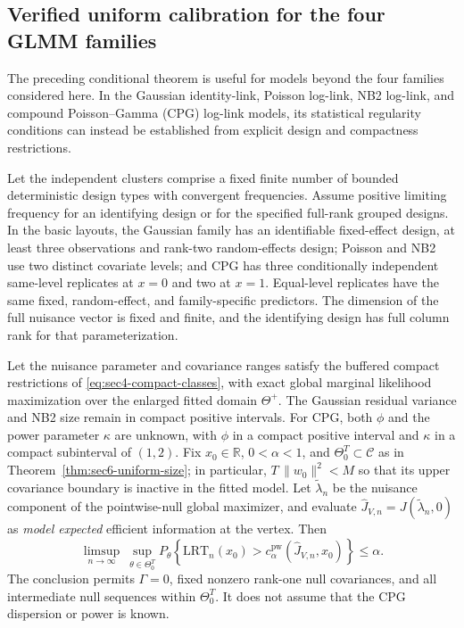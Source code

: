 \subsection{Verified uniform calibration for the four GLMM families}
\label{subsec:sec6-four-family-uniform}

The preceding conditional theorem is useful for models
beyond the four families considered here. In the Gaussian
identity-link, Poisson log-link, NB2 log-link, and compound
Poisson--Gamma (CPG) log-link models, its statistical
regularity conditions can instead be established from
explicit design and compactness restrictions.

\begin{theorem}
\label{thm:sec6-four-family-uniform}
Let the independent clusters comprise a fixed finite number
of bounded deterministic design types with convergent
frequencies. Assume positive limiting frequency for an
identifying design or for the specified full-rank grouped
designs. In the basic layouts, the Gaussian family has an
identifiable fixed-effect design, at least three observations
and rank-two random-effects design; Poisson and NB2 use two
distinct covariate levels; and CPG has three conditionally
independent same-level replicates at $x=0$ and two at $x=1$.
Equal-level replicates have the same fixed, random-effect,
and family-specific predictors. The dimension of the full
nuisance vector is fixed and finite, and the identifying
design has full column rank for that parameterization.

Let the nuisance parameter and covariance ranges satisfy
the buffered compact restrictions of
\eqref{eq:sec4-compact-classes}, with exact global marginal
likelihood maximization over the enlarged fitted domain
$\Theta^+$. The Gaussian residual variance and NB2 size
remain in compact positive intervals. For CPG, both
$\phi$ and the power parameter $\kappa$ are unknown,
with $\phi$ in a compact positive interval and
$\kappa$ in a compact subinterval of $(1,2)$.
Fix $x_0\in\mathbb R$, $0<\alpha<1$, and
$\Theta_0^T\subset\mathcal C$ as in
Theorem~\ref{thm:sec6-uniform-size}; in particular,
$T\,\|w_0\|^2<M$ so that its upper covariance boundary
is inactive in the fitted model. Let
$\widetilde\lambda_n$ be the nuisance component of the
pointwise-null global maximizer, and evaluate
$\widehat J_{V,n}=J(\widetilde\lambda_n,0)$ as
\emph{model expected} efficient information at the vertex.
Then
\begin{equation}\label{eq:sec6-four-family-size}
\boxed{\displaystyle
\limsup_{n\to\infty}\ \sup_{\theta\in\Theta_0^T}
P_\theta\!\left\{
\mathrm{LRT}_n(x_0)>
 c_{\alpha}^{\mathrm{pw}}(\widehat J_{V,n},x_0)
\right\}\leq\alpha.}
\end{equation}
The conclusion permits $\Gamma=0$, fixed nonzero
rank-one null covariances, and all intermediate null
sequences within $\Theta_0^T$. It does not assume that
the CPG dispersion or power is known.
\end{theorem}

